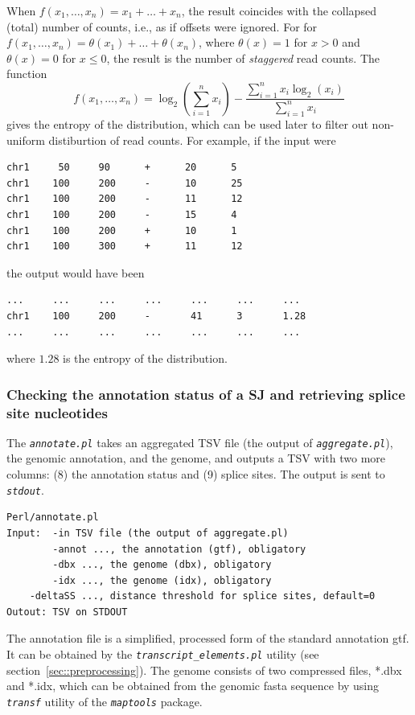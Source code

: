 \documentclass{article}
\newcommand{\prog}[1]{{\tt\em #1}}
\begin{document}
When $f(x_1,\dots,x_n) = x_1+\dots+x_n$, the result coincides with the collapsed (total) number of counts, i.e., as if offsets were ignored.
For for $f(x_1,\dots,x_n) = \theta(x_1)+\dots+\theta(x_n)$, where $\theta(x)=1$ for $x>0$ and $\theta(x)=0$ for $x\le0$, the result is the 
number of {\em staggered} read counts. The function 
$$f(x_1,\dots,x_n) = \log_2(\sum\limits_{i=1}^nx_i) - \frac{\sum\limits_{i=1}^nx_i\log_2(x_i)}{\sum\limits_{i=1}^nx_i}$$ 
gives the entropy of the distribution, which can be used later to filter out non-uniform distiburtion of read counts. 
For example, if the input were
\begin{verbatim}
chr1     50     90      +      20      5
chr1    100     200     -      10      25
chr1    100     200     -      11      12
chr1    100     200     -      15      4
chr1    100     200     +      10      1
chr1    100     300     +      11      12
\end{verbatim}
the output would have been
\begin{verbatim}
...     ...     ...     ...     ...     ...     ...
chr1    100     200     -       41      3       1.28
...     ...     ...     ...     ...     ...     ...
\end{verbatim}
where $1.28$ is the entropy of the distribution.


\subsubsection[Annotation status and splice site nucleotides]{Checking the annotation status of a SJ and retrieving splice site nucleotides}
\label{sec::annotation_status}
The \prog{annotate.pl} takes an aggregated TSV file (the output of \prog{aggregate.pl}), the genomic annotation, and the genome, and outputs a TSV 
with two more columns: (8) the annotation status and (9) splice sites. The output is sent to \prog{stdout}.
\begin{verbatim}
Perl/annotate.pl
Input:  -in TSV file (the output of aggregate.pl)
        -annot ..., the annotation (gtf), obligatory
        -dbx ..., the genome (dbx), obligatory
        -idx ..., the genome (idx), obligatory
	-deltaSS ..., distance threshold for splice sites, default=0
Outout: TSV on STDOUT
\end{verbatim}
The annotation file is a simplified, processed form of the standard annotation gtf. It can be obtained by the \prog{transcript\_elements.pl} utility (see section~\ref{sec::preprocessing}).
The genome consists of two compressed files, *.dbx and *.idx, which can be obtained from the genomic fasta sequence by using \prog{transf} utility of the \prog{maptools} package. 
\end{document}
